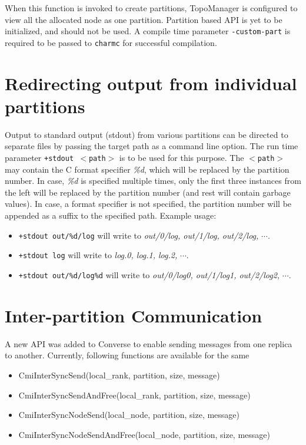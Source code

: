 \begin{itemize}
When this function is invoked to create partitions, TopoManager is configured to 
view all the allocated node as one partition. Partition based API is yet to be 
initialized, and should not be used. A compile time parameter {\tt -custom-part} 
is required to be passed to {\tt charmc} for successful compilation.
\end{itemize}

\section{Redirecting output from individual partitions}
Output to standard output (stdout) from various partitions can be directed 
to separate files by passing the target path as a command line option. The run
time parameter {\tt +stdout $<$path$>$} is to be used for this purpose. The
{\tt $<$path$>$} may contain the C format specifier \emph{\%d}, which will be replaced by the
partition number. In case, \emph{\%d} is specified multiple times, only the first
three instances from the left will be replaced by the partition number (and rest
will contain garbage values). In case, a format specifier is not specified, 
the partition number will be appended as a suffix to the specified path. Example usage:

\begin{itemize}
\item {\tt +stdout out/\%d/log} will write to \emph{out/0/log, out/1/log,
out/2/log,} $\cdots$.
\item {\tt +stdout log} will write to \emph{log.0, log.1, log.2,} $\cdots$.
\item {\tt +stdout out/\%d/log\%d} will write to \emph{out/0/log0, out/1/log1,
out/2/log2,} $\cdots$.
\end{itemize}

\section{Inter-partition Communication}

A new API was added to Converse to enable sending messages from one replica to
another. Currently, following functions are available for the same
\begin{itemize}
\item CmiInterSyncSend(local\_rank, partition, size, message)        
\item CmiInterSyncSendAndFree(local\_rank, partition, size, message)
\item CmiInterSyncNodeSend(local\_node, partition, size, message)        
\item CmiInterSyncNodeSendAndFree(local\_node, partition, size, message)
\end{itemize}

